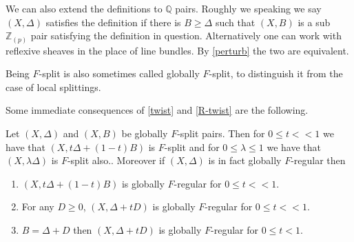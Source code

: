 \documentclass[a4paper,12pt]{book}
\newcommand{\zp}{\mathbb{Z}_{(p)}}
\begin{document}
\begin{remark}\label{R-Def}
	
	We can also extend the definitions to $\mathbb{Q}$ pairs. Roughly we speaking we say $(X,\Delta)$ satisfies the definition if there is $B \geq \Delta$ such that $(X,B)$ is a sub $\zp$ pair satisfying the definition in question. Alternatively one can work with reflexive sheaves in the place of line bundles. By \autoref{perturb} the two are equivalent.	
	\end{remark}

Being $F$-split is also sometimes called globally $F$-split, to distinguish it from the case of local splittings.

Some immediate consequences of \autoref{twist} and \autoref{R-twist} are the following.

\begin{lemma}\label{perturb}
	
	Let $(X,\Delta)$ and $(X,B)$ be globally $F$-split pairs. Then for $0 \leq t <<1$ we have that $(X,t\Delta+(1-t)B)$ is $F$-split and for $0 \leq \lambda \leq 1$ we have that $(X,\lambda \Delta)$ is $F$-split also.. Moreover if $(X,\Delta)$ is in fact globally $F$-regular then
	
	\begin{enumerate}
		\item $(X,t\Delta +(1-t)B)$ is globally $F$-regular for $0 \leq t <<1$.
		\item For any $D \geq 0$, $(X,\Delta+tD)$ is globally $F$-regular for $0 \leq t <<1$. 
		\item $B=\Delta+D$ then $(X,\Delta+tD)$ is globally $F$-regular for $0 \leq t <1$.
	\end{enumerate}

	\end{lemma}
\end{document}
